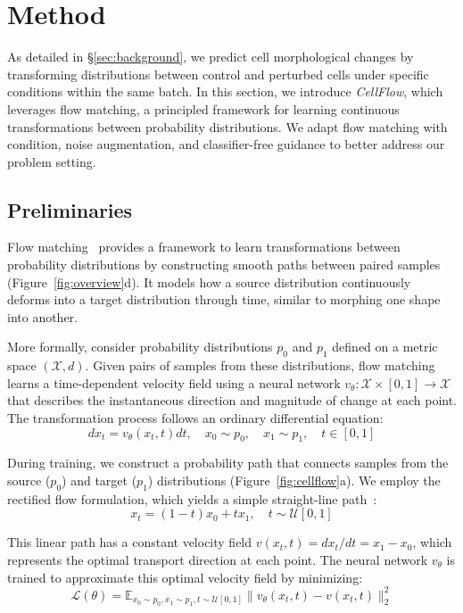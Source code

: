 \section{Method}
\label{sec:method}

As detailed in \S\ref{sec:background}, we predict cell morphological changes by transforming distributions between control and perturbed cells under specific conditions within the same batch. In this section, we introduce \emph{CellFlow}, which leverages flow matching, a principled framework for learning continuous transformations between probability distributions. We adapt flow matching with condition, noise augmentation, and classifier-free guidance to better address our problem setting.



\subsection{Preliminaries}

Flow matching~\cite{lipman2022flow,lipman2024flow} provides a framework to learn transformations between probability distributions by constructing smooth paths between paired samples (Figure~\ref{fig:overview}d). It models how a source distribution continuously deforms into a target distribution through time, similar to morphing one shape into another. 

More formally, consider probability distributions $p_0$ and $p_1$ defined on a metric space $(\mathcal{X}, d)$. Given pairs of samples from these distributions, flow matching learns a time-dependent velocity field using a neural network $v_\theta: \mathcal{X} \times [0,1] \rightarrow \mathcal{X}$ that describes the instantaneous direction and magnitude of change at each point. The transformation process follows an ordinary differential equation:
\[
{dx_t} = v_\theta(x_t, t){dt}, \quad x_0 \sim p_0, \quad x_1 \sim p_1, \quad t \in [0, 1]
\]

During training, we construct a probability path that connects samples from the source ($p_0$) and target ($p_1$) distributions (Figure~\ref{fig:cellflow}a). We employ the rectified flow formulation, which yields a simple straight-line path~\cite{liu2022flow}:
\[ x_t = (1-t)x_0 + tx_1, \quad t \sim \mathcal{U}[0,1] \]

This linear path has a constant velocity field $v(x_t, t) = dx_t/dt = x_1 - x_0$, which represents the optimal transport direction at each point. The neural network $v_\theta$ is trained to approximate this optimal velocity field by minimizing:
\[ \mathcal{L}(\theta) = \mathbb{E}_{x_0 \sim p_0, x_1 \sim p_1, t \sim \mathcal{U}[0,1]} \|v_\theta(x_t, t) - v(x_t, t)\|_2^2 \]

